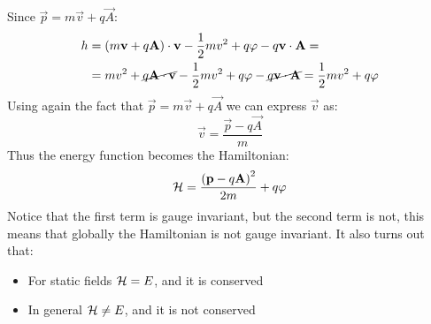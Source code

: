 Since $\vec{p} = m\vec{v} + q\vec{A}$:
\begin{equation}
  \begin{split}
    h &= \left(m\vb{v} + q\vb{A}\right)\cdot \vb{v} - \dfrac{1}{2}mv^2 +q\varphi - q\vb{v} \cdot \vb{A} =\\
    &= mv^2 + \cancel{q\vb{A} \cdot \vb{v}} - \dfrac{1}{2}mv^2 + q\varphi - \cancel{ q\vb{v} \cdot \vb{A}} = \dfrac{1}{2}mv^2 + q\varphi
  \end{split}
\end{equation}
Using again the fact that $\vec{p} = m\vec{v} + q\vec{A}$ we can express $\vec{v}$ as:
\begin{equation}
  \vec{v} = \dfrac{\vec{p} - q\vec{A}}{m}
\end{equation}
Thus the energy function becomes the Hamiltonian:
\begin{equation}
  \mathcal{H} = \dfrac{\left(\vb{p} - q\vb{A}\right)^2}{2m} + q\varphi
\end{equation}
Notice that the first term is gauge invariant, but the second term is not, this means that globally the Hamiltonian is not gauge invariant. It also turns out that:
\begin{itemize}
  \item For static fields $\mathcal{H} = E$, and it is conserved
  \item In general $\mathcal{H} \neq E$, and it is not conserved
\end{itemize}
